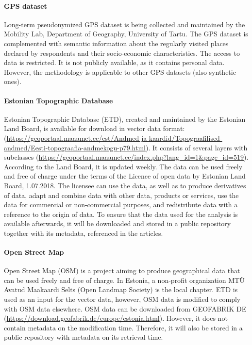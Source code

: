 \documentclass[]{article}
\let\oldparagraph\paragraph
\renewcommand{\paragraph}[1]{\oldparagraph{#1}\mbox{}}
\begin{document}
\hypertarget{gps-dataset}{%
\paragraph{GPS dataset}\label{gps-dataset}}

Long-term pseudonymized GPS dataset is being collected and maintained by
the Mobility Lab, Department of Geography, University of Tartu. The GPS
dataset is complemented with semantic information about the regularly
visited places declared by respondents and their socio-economic
characteristics. The access to data is restricted. It is not publicly
available, as it contains personal data. However, the methodology is
applicable to other GPS datasets (also synthetic ones).

\hypertarget{estonian-topographic-database}{%
\paragraph{Estonian Topographic
Database}\label{estonian-topographic-database}}

Estonian Topographic Database (ETD), created and maintained by the
Estonian Land Board, is available for download in vector data format:
(\url{https://geoportaal.maaamet.ee/est/Andmed-ja-kaardid/Topograafilised-andmed/Eesti-topograafia-andmekogu-p79.html}).
It consists of several layers with subclasses
(\url{https://geoportaal.maaamet.ee/index.php?lang_id=1\&page_id=519}).
According to the Land Board, it is updated weekly. The data can be used
freely and free of charge under the terms of the Licence of open data by
Estonian Land Board, 1.07.2018. The licensee can use the data, as well
as to produce derivatives of data, adapt and combine data with other
data, products or services, use the data for commercial or
non-commercial purposes, and redistribute data with a reference to the
origin of data. To ensure that the data used for the analysis is
available afterwards, it will be downloaded and stored in a public
repository together with its metadata, referenced in the articles.

\hypertarget{open-street-map}{%
\paragraph{Open Street Map}\label{open-street-map}}

Open Street Map (OSM) is a project aiming to produce geographical data
that can be used freely and free of charge. In Estonia, a non-profit
organization MTÜ Avatud Maakaardi Selts (Open Landmap Society) is the
local chapter. ETD is used as an input for the vector data, however, OSM
data is modified to comply with OSM data elsewhere. OSM data can be
downloaded from GEOFABRIK DE
(\url{https://download.geofabrik.de/europe/estonia.html}). However, it
does not contain metadata on the modification time. Therefore, it will
also be stored in a public repository with metadata on its retrieval
time.
\end{document}
